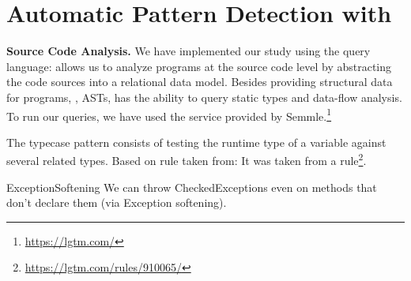 \chapter{Automatic Pattern Detection with \ql{}}\label{ap:ql}



\textbf{Source Code Analysis.}
We have implemented our study using the \ql{} query language:
\ql{} allows us to analyze programs at the source code level by abstracting the code sources into a relational data model.
Besides providing structural data for programs, \ie{}, ASTs, \ql{} has the ability to query static types and data-flow analysis.
To run our \ql{} queries, we have used the service provided by Semmle.\footnote{\url{https://lgtm.com/}} 


The typecase pattern consists of testing the runtime type of a variable against several related types.
Based on rule taken from:
It was taken from a \lgtm{} rule\footnote{\url{https://lgtm.com/rules/910065/}}.

    
    
    
    
    
    
    
ExceptionSoftening
We can throw CheckedExceptions even on methods that don't declare them (via Exception softening).
    
